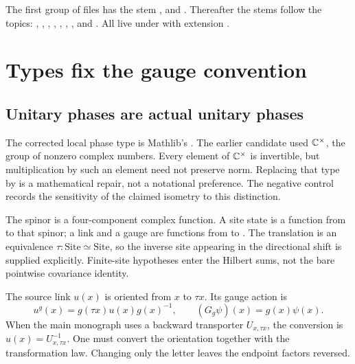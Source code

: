 The first group of files has the stem ,  and . Thereafter the stems follow the topics: , , , , , , ,  and . All live under  with extension .

\section{Types fix the gauge convention}

\subsection{Unitary phases are actual unitary phases}

The corrected local phase type is Mathlib's . The earlier candidate used \(\mathbb C^\times\), the group of nonzero complex numbers. Every element of \(\mathbb C^\times\) is invertible, but multiplication by such an element need not preserve norm. Replacing that type by  is a mathematical repair, not a notational preference. The negative control  records the sensitivity of the claimed isometry to this distinction.

The spinor is a four-component complex function. A site state is a function from  to that spinor; a link and a gauge are functions from  to . The translation is an equivalence \(\tau:\mathrm{Site}\simeq\mathrm{Site}\), so the inverse site appearing in the directional shift is supplied explicitly. Finite-site hypotheses enter the Hilbert sums, not the bare pointwise covariance identity.

The source link \(u(x)\) is oriented from \(x\) to \(\tau x\). Its gauge action is
\[
 u^g(x)=g(\tau x)u(x)g(x)^{-1},
 \qquad (G_g\psi)(x)=g(x)\psi(x).
\]
When the main monograph uses a backward transporter \(U_{x,\tau x}\), the conversion is \(u(x)=U_{x,\tau x}^{-1}\). One must convert the orientation together with the transformation law. Changing only the letter leaves the endpoint factors reversed.


